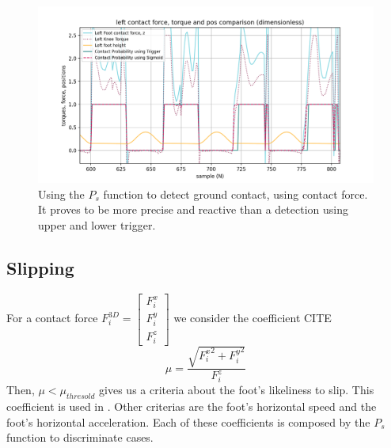 \documentclass[a4paper,10pt]{article}
\begin{document}
\begin{figure}[H]
\label{fig:sigmoid_contact_detection}
\centering
  \includegraphics[width=\linewidth, angle=0, scale=1.0]{./images/Torque_Contact_Detection_Comp_difficile.png}
  \caption{Using the $P_s$ function to detect ground contact, using contact force. \\ It proves to be more precise and reactive than a detection using upper and lower trigger.}
\end{figure}



\subsection{Slipping}
For a contact force $F_i^{3D} = \begin{bmatrix}F_i^x\\ F_i^y\\ F_i^z \end{bmatrix}$  we consider the coefficient CITE
$$\mu = \frac{\sqrt{ {F_i^x}^{2} + {F_i^y}^{2}}}{F_i^z} $$
Then, $\mu < \mu_{thresold}$ gives us a criteria about the foot's likeliness to slip. This coefficient is used in \cite{Camurri_2018}. 
Other criterias are the foot's horizontal speed and the foot's horizontal acceleration. 
Each of these coefficients is composed by the $P_s$ function to discriminate cases.
\end{document}
